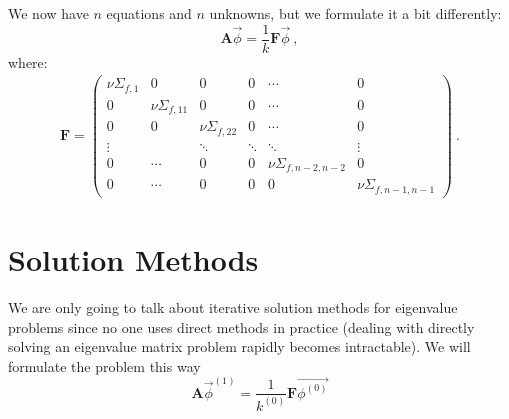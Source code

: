 \documentclass[12pt]{article}
\newcommand{\ve}[1]{\ensuremath{\mathbf{#1}}}
\begin{document}
We now have $n$ equations and $n$ unknowns, but we formulate it a bit differently: 
\[\ve{A}\vec{\phi} = \frac{1}{k}\ve{F}\vec{\phi}\:,\]
where:
\begin{align}
%
\ve{F} = \begin{pmatrix}
\nu\Sigma_{f,1} & 0 & 0 & 0 & \cdots & 0 \\
0   & \nu\Sigma_{f,11} & 0  & 0 & \cdots & 0 \\
0   & 0 & \nu\Sigma_{f,22}  & 0 & \cdots & 0 \\
\vdots  &     & \ddots  & \ddots & \ddots  & \vdots \\
0 & \cdots & 0 & 0 & \nu\Sigma_{f,n-2,n-2} & 0 \\
0        & \cdots & 0 & 0   & 0 & \nu\Sigma_{f,n-1,n-1} 
\end{pmatrix} \:.\nonumber
\end{align}


\section*{Solution Methods}

We are only going to talk about iterative solution methods for eigenvalue problems since no one uses direct methods in practice (dealing with directly solving an eigenvalue matrix problem rapidly becomes intractable). We will formulate the problem this way
%
\[ \ve{A} \vec{\phi}^{(1)} = \frac{1}{k^{(0)}}\ve{F}\vec{\phi^{(0)}}\]
\end{document}

